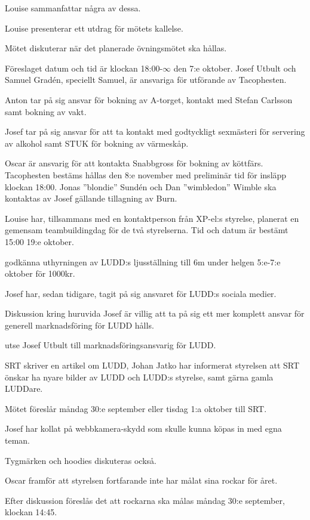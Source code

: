 \documentclass{protokoll}
\begin{document}
Louise sammanfattar några av dessa. 

Louise presenterar ett utdrag för mötets kallelse.

Mötet diskuterar när det planerade övningsmötet ska hållas.


Föreslaget datum och tid är klockan 18:00-$\infty$ den 7:e oktober.
Josef Utbult och Samuel Gradén, speciellt Samuel, är ansvariga för utförande av 
Tacophesten. 

Anton tar på sig ansvar för bokning av A-torget, kontakt med Stefan Carlsson 
samt bokning av vakt.

Josef tar på sig ansvar för att ta kontakt med godtyckligt sexmästeri för 
servering av alkohol samt STUK för bokning av värmeskåp.

Oscar är ansvarig för att kontakta Snabbgross för bokning av köttfärs.
Tacophesten bestäms hållas den 8:e november med preliminär tid för insläpp
klockan 18:00.
Jonas ''blondie'' Sundén och Dan ''wimbledon'' Wimble ska kontaktas av Josef 
gällande tillagning av Burn. 

Louise har, tillsammans med en kontaktperson från XP-el:s styrelse, planerat en
gemensam teambuildingdag för de två styrelserna. Tid och datum är bestämt 15:00
19:e oktober. 

\begin{beslut}
  \att godkänna uthyrningen av LUDD:s ljusställning till 6m under helgen
  5:e-7:e oktober för 1000kr.
\end{beslut}

Josef har, sedan tidigare, tagit på sig ansvaret för LUDD:s sociala medier.  

Diskussion kring huruvida Josef är villig att ta på sig ett mer komplett
ansvar för generell marknadsföring för LUDD hålls.
\begin{beslut}
  \att utse Josef Utbult till marknadsföringsansvarig för LUDD.
\end{beslut}

SRT skriver en artikel om LUDD, Johan Jatko har informerat styrelsen att SRT
önskar ha nyare bilder av LUDD och LUDD:s styrelse, samt gärna gamla LUDDare. 

Mötet föreslår måndag 30:e september eller tisdag 1:a oktober till SRT.

Josef har kollat på webbkamera-skydd som skulle kunna köpas in med egna teman. 


Tygmärken och hoodies diskuteras också. 

Oscar framför att styrelsen fortfarande inte har målat sina rockar för året. 


Efter diskussion föreslås det att rockarna ska målas måndag 30:e september, 
klockan 14:45.
\end{document}
